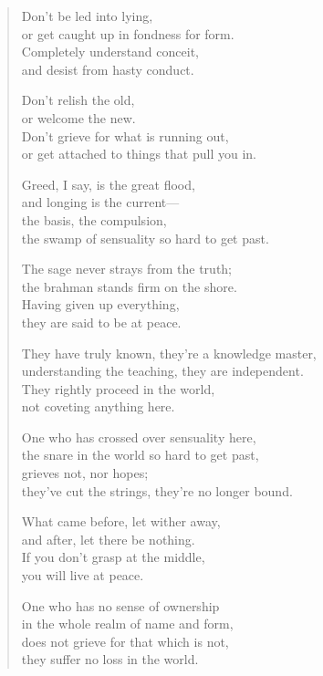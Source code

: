 \documentclass[12pt,openany]{book}%
\begin{document}
\begin{verse}
Don’t be led into lying, \\
or get caught up in fondness for form. \\
Completely understand conceit, \\
and desist from hasty conduct. 

Don’t relish the old, \\
or welcome the new. \\
Don’t grieve for what is running out, \\
or get attached to things that pull you in. 

Greed, I say, is the great flood, \\
and longing is the current—\\
the basis, the compulsion, \\
the swamp of sensuality so hard to get past. 

The sage never strays from the truth; \\
the brahman stands firm on the shore. \\
Having given up everything, \\
they are said to be at peace. 

They have truly known, they’re a knowledge master, \\
understanding the teaching, they are independent. \\
They rightly proceed in the world, \\
not coveting anything here. 

One who has crossed over sensuality here, \\
the snare in the world so hard to get past, \\
grieves not, nor hopes; \\
they’ve cut the strings, they’re no longer bound. 

What came before, let wither away, \\
and after, let there be nothing. \\
If you don’t grasp at the middle, \\
you will live at peace. 

One who has no sense of ownership \\
in the whole realm of name and form, \\
does not grieve for that which is not, \\
they suffer no loss in the world. 


\end{verse}
\end{document}
